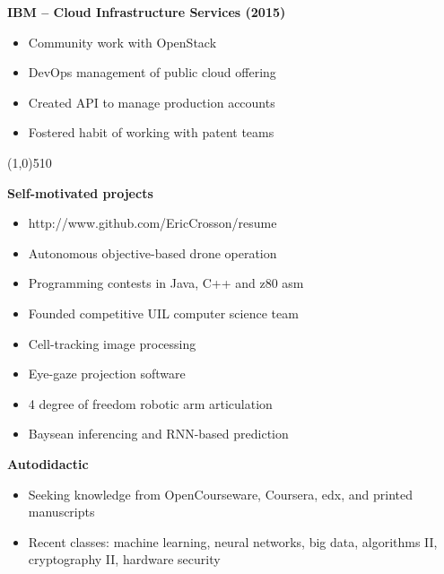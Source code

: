 \documentclass{report}
\newcommand{\cut}{\begin{center} \line(1,0){510} \end{center}}
\begin{document}
\begin{paracol}{2}
  \textbf{IBM -- Cloud Infrastructure Services (2015)}
  \begin{itemize}[label=$\circ$]
  \item Community work with OpenStack
  \item DevOps management of public cloud offering
  \item Created API to manage production accounts
  \item Fostered habit of working with patent teams
  \end{itemize}
\end{paracol}

\cut{}

\textbf{Self-motivated projects}
\begin{paracol}{2}

  \begin{itemize}[label=$\circ$]
  \item http://www.github.com/EricCrosson/resume
  \item Autonomous objective-based drone operation
  \item Programming contests in Java, C++ and z80 asm
  \item Founded competitive UIL computer science team
  \end{itemize}

  \switchcolumn{}
  \begin{itemize}[label=$\circ$]
  \item Cell-tracking image processing
  \item Eye-gaze projection software
  \item 4 degree of freedom robotic arm articulation
  \item Baysean inferencing and RNN-based prediction
  \end{itemize}
\end{paracol}

\textbf{Autodidactic}
\begin{itemize}[label=$\circ$]
\item Seeking knowledge from OpenCourseware, Coursera, edx, and printed manuscripts
\item Recent classes: machine learning, neural networks, big data, algorithms II,
  cryptography II, hardware security
\end{itemize}


\end{document}
